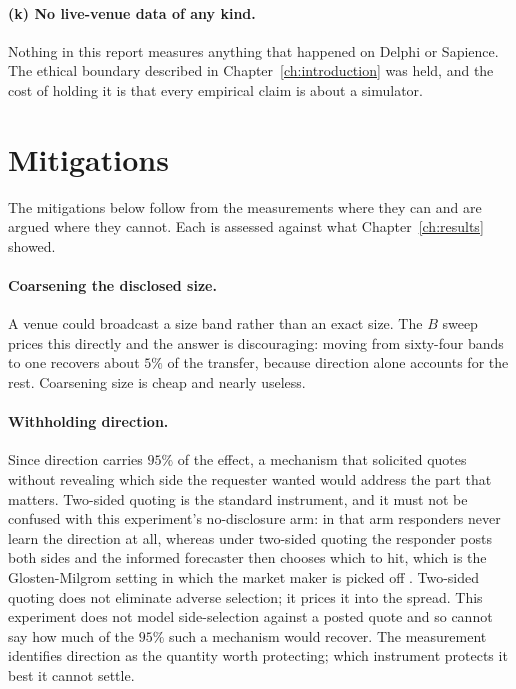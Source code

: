 \paragraph{(k) No live-venue data of any kind.} Nothing in this report measures anything
that happened on Delphi or Sapience. The ethical boundary described in
Chapter~\ref{ch:introduction} was held, and the cost of holding it is that every empirical
claim is about a simulator.

\section{Mitigations}
\label{sec:mitigations}

The mitigations below follow from the measurements where they can and are argued where they
cannot. Each is assessed against what Chapter~\ref{ch:results} showed.

\paragraph{Coarsening the disclosed size.} A venue could broadcast a size band rather than an
exact size. The $B$ sweep prices this directly and the answer is discouraging: moving from
sixty-four bands to one recovers about $5\%$ of the transfer, because direction alone
accounts for the rest. Coarsening size is cheap and nearly useless.

\paragraph{Withholding direction.} Since direction carries $95\%$ of the effect, a mechanism
that solicited quotes without revealing which side the requester wanted would address the
part that matters. Two-sided quoting is the standard instrument, and it must not be confused
with this experiment's no-disclosure arm: in that arm responders never learn the direction
at all, whereas under two-sided quoting the responder posts both sides and the informed
forecaster then chooses which to hit, which is the Glosten-Milgrom setting in which the
market maker is picked off \cite{glosten1985bidask}. Two-sided quoting does not eliminate
adverse selection; it prices it into the spread. This experiment does not model
side-selection against a posted quote and so cannot say how much of the $95\%$ such a
mechanism would recover. The measurement identifies direction as the quantity worth
protecting; which instrument protects it best it cannot settle.


